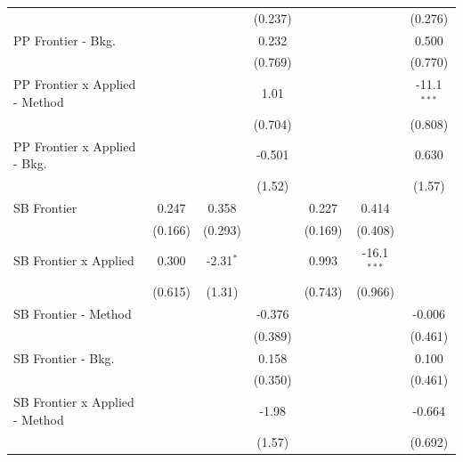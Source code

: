 \begin{tabular}{lcccccc}
                                  &         &              & (0.237)       &             &               & (0.276)\\   
   PP Frontier - Bkg.             &         &              & 0.232         &             &               & 0.500\\   
                                  &         &              & (0.769)       &             &               & (0.770)\\   
   PP Frontier x Applied - Method &         &              & 1.01          &             &               & -11.1$^{***}$\\   
                                  &         &              & (0.704)       &             &               & (0.808)\\   
   PP Frontier x Applied - Bkg.   &         &              & -0.501        &             &               & 0.630\\   
                                  &         &              & (1.52)        &             &               & (1.57)\\   
   SB Frontier                    & 0.247   & 0.358        &               & 0.227       & 0.414         &   \\   
                                  & (0.166) & (0.293)      &               & (0.169)     & (0.408)       &   \\   
   SB Frontier x Applied          & 0.300   & -2.31$^{*}$  &               & 0.993       & -16.1$^{***}$ &   \\   
                                  & (0.615) & (1.31)       &               & (0.743)     & (0.966)       &   \\   
   SB Frontier - Method           &         &              & -0.376        &             &               & -0.006\\   
                                  &         &              & (0.389)       &             &               & (0.461)\\   
   SB Frontier - Bkg.             &         &              & 0.158         &             &               & 0.100\\   
                                  &         &              & (0.350)       &             &               & (0.461)\\   
   SB Frontier x Applied - Method &         &              & -1.98         &             &               & -0.664\\   
                                  &         &              & (1.57)        &             &               & (0.692)\\   

\end{tabular}
